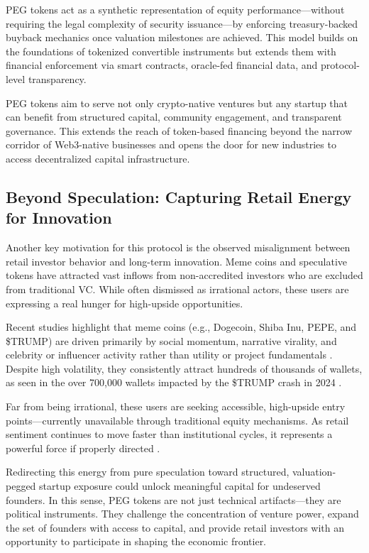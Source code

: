 \documentclass[conference]{IEEEtran}
\begin{document}
PEG tokens act as a synthetic representation of equity performance—without requiring the legal complexity of security issuance—by enforcing treasury-backed buyback mechanics once valuation milestones are achieved. This model builds on the foundations of tokenized convertible instruments but extends them with financial enforcement via smart contracts, oracle-fed financial data, and protocol-level transparency.

PEG tokens aim to serve not only crypto-native ventures but any startup that can benefit from structured capital, community engagement, and transparent governance. This extends the reach of token-based financing beyond the narrow corridor of Web3-native businesses and opens the door for new industries to access decentralized capital infrastructure.

\subsection{Beyond Speculation: Capturing Retail Energy for Innovation}

Another key motivation for this protocol is the observed misalignment between retail investor behavior and long-term innovation. Meme coins and speculative tokens have attracted vast inflows from non-accredited investors who are excluded from traditional VC. While often dismissed as irrational actors, these users are expressing a real hunger for high-upside opportunities.

Recent studies highlight that meme coins (e.g., Dogecoin, Shiba Inu, PEPE, and \$TRUMP) are driven primarily by social momentum, narrative virality, and celebrity or influencer activity rather than utility or project fundamentals \cite{ssrn4891841, rutgers2023meme}. Despite high volatility, they consistently attract hundreds of thousands of wallets, as seen in the over 700,000 wallets impacted by the \$TRUMP crash in 2024 \cite{wikipediaTrump}.

Far from being irrational, these users are seeking accessible, high-upside entry points—currently unavailable through traditional equity mechanisms. As retail sentiment continues to move faster than institutional cycles, it represents a powerful force if properly directed \cite{marketwatch2022retail, arxiv2104.01847}.

Redirecting this energy from pure speculation toward structured, valuation-pegged startup exposure could unlock meaningful capital for undeserved founders. In this sense, PEG tokens are not just technical artifacts—they are political instruments. They challenge the concentration of venture power, expand the set of founders with access to capital, and provide retail investors with an opportunity to participate in shaping the economic frontier.
\end{document}

